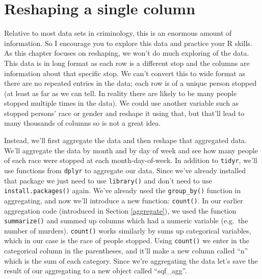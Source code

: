 \documentclass[
]{krantz}
\begin{document}
\hypertarget{reshaping-a-single-column}{%
\section{Reshaping a single column}\label{reshaping-a-single-column}}

Relative to most data sets in criminology, this is an enormous amount of information. So I encourage you to explore this data and practice your R skills. As this chapter focuses on reshaping, we won't do much exploring of the data. This data is in long format as each row is a different stop and the columns are information about that specific stop. We can't convert this to wide format as there are no repeated entries in the data; each row is of a unique person stopped (at least as far as we can tell. In reality there are likely to be many people stopped multiple times in the data). We could use another variable such as stopped persons' race or gender and reshape it using that, but that'll lead to many thousands of columns so is not a great idea.

Instead, we'll first aggregate the data and then reshape that aggregated data. We'll aggregate the data by month and by day of week and see how many people of each race were stopped at each month-day-of-week. In addition to \texttt{tidyr}, we'll use functions from \texttt{dplyr} to aggregate our data. Since we've already installed that package we just need to use \texttt{library()} and don't need to use \texttt{install.packages()} again. We've already used the \texttt{group\_by()} function in aggregating, and now we'll introduce a new function: \texttt{count()}. In our earlier aggregation code (introduced in Section \ref{aggregate}), we used the function \texttt{summarize()} and summed up columns which had a numeric variable (e.g.~the number of murders). \texttt{count()} works similarly by sums up categorical variables, which in our case is the race of people stopped. Using \texttt{count()} we enter in the categorical column in the parentheses, and it'll make a new column called ``n'' which is the sum of each category. Since we're aggregating the data let's save the result of our aggregating to a new object called ``sqf\_agg''.
\end{document}
